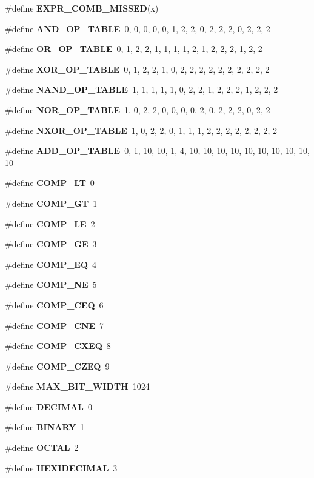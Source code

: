 \begin{CompactItemize}
\item 
\#define {\bf EXPR\_\-COMB\_\-MISSED}(x)
\item 
\#define {\bf AND\_\-OP\_\-TABLE}\ 0,  0,  0,  0,  0,  1,  2,  2,  0,  2,  2,  2,  0,  2,  2,  2
\item 
\#define {\bf OR\_\-OP\_\-TABLE}\ 0,  1,  2,  2,  1,  1,  1,  1,  2,  1,  2,  2,  2,  1,  2,  2
\item 
\#define {\bf XOR\_\-OP\_\-TABLE}\ 0,  1,  2,  2,  1,  0,  2,  2,  2,  2,  2,  2,  2,  2,  2,  2
\item 
\#define {\bf NAND\_\-OP\_\-TABLE}\ 1,  1,  1,  1,  1,  0,  2,  2,  1,  2,  2,  2,  1,  2,  2,  2
\item 
\#define {\bf NOR\_\-OP\_\-TABLE}\ 1,  0,  2,  2,  0,  0,  0,  0,  2,  0,  2,  2,  2,  0,  2,  2
\item 
\#define {\bf NXOR\_\-OP\_\-TABLE}\ 1,  0,  2,  2,  0,  1,  1,  1,  2,  2,  2,  2,  2,  2,  2,  2
\item 
\#define {\bf ADD\_\-OP\_\-TABLE}\ 0,  1,  10, 10, 1,  4,  10, 10, 10, 10, 10, 10, 10, 10, 10, 10
\item 
\#define {\bf COMP\_\-LT}\ 0
\item 
\#define {\bf COMP\_\-GT}\ 1
\item 
\#define {\bf COMP\_\-LE}\ 2
\item 
\#define {\bf COMP\_\-GE}\ 3
\item 
\#define {\bf COMP\_\-EQ}\ 4
\item 
\#define {\bf COMP\_\-NE}\ 5
\item 
\#define {\bf COMP\_\-CEQ}\ 6
\item 
\#define {\bf COMP\_\-CNE}\ 7
\item 
\#define {\bf COMP\_\-CXEQ}\ 8
\item 
\#define {\bf COMP\_\-CZEQ}\ 9
\item 
\#define {\bf MAX\_\-BIT\_\-WIDTH}\ 1024
\item 
\#define {\bf DECIMAL}\ 0
\item 
\#define {\bf BINARY}\ 1
\item 
\#define {\bf OCTAL}\ 2
\item 
\#define {\bf HEXIDECIMAL}\ 3
\end{CompactItemize}
